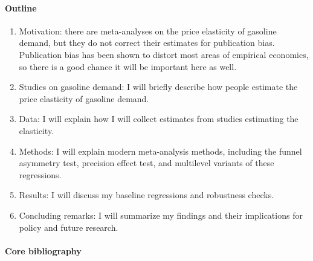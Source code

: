 \paragraph{Outline}
\begin{enumerate}
	\item Motivation: there are meta-analyses on the price elasticity of gasoline demand, but they do not correct their estimates for publication bias. Publication bias has been shown to distort most areas of empirical economics, so there is a good chance it will be important here as well.
	\item Studies on gasoline demand: I will briefly describe how people estimate the price elasticity of gasoline demand.
	\item Data: I will explain how I will collect estimates from studies estimating the elasticity.
	\item Methods: I will explain modern meta-analysis methods, including the funnel asymmetry test, precision effect test, and multilevel variants of these regressions.
	\item Results: I will discuss my baseline regressions and robustness checks.
	\item Concluding remarks: I will summarize my findings and their implications for policy and future research.
\end{enumerate}


\paragraph{Core bibliography}



